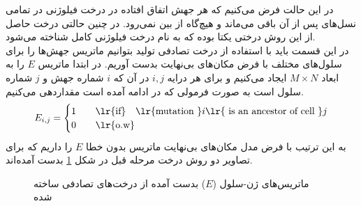 در این حالت فرض می‌کنیم که هر جهش اتفاق افتاده در درخت فیلوژنی در تمامی نسل‌های پس از آن باقی می‌ماند و هیچ‌گاه از بین نمی‌رود. در چنین حالتی درخت حاصل از این روش درختی یکتا بوده که به نام درخت فیلوژنی کامل شناخته می‌شود.
\\
در این قسمت باید با استفاده از درخت تصادفی تولید بتوانیم ماتریس جهش‌ها را برای سلول‌های مختلف با فرض مکان‌های بی‌نهایت بدست آوریم. 
در ابتدا ماتریس $E$ را به ابعاد $M\times N$ ایجاد می‌کنیم و برای هر درایه $i,j$ در آن که $i$ شماره جهش و $j$ شماره سلول است به صورت فرمولی که در ادامه آمده است مقداردهی می‌کنیم.
\begin{equation}
	E_{i,j} = 
	\begin{cases} 
		1  \quad &\text{\lr{if}} \quad \text{\lr{mutation }} i \text{\lr{ is an ancestor of cell }} j \\
		0 \quad &\text{\lr{o.w}}
	\end{cases}
\end{equation}
به این ترتیب با فرض مدل مکان‌های بی‌نهایت ماتریس بدون خطا $E$ را داریم که برای تصاویر دو روش درخت مرحله قبل در شکل \ref{fig:E} بدست آمده‌اند.
\begin{figure}[!ht]
	\centering
	\hfill
	\caption{ماتریس‌های ژن-سلول ($E$) بدست آمده از درخت‌های تصادفی ساخته شده}
	\label{fig:E}
\end{figure}



